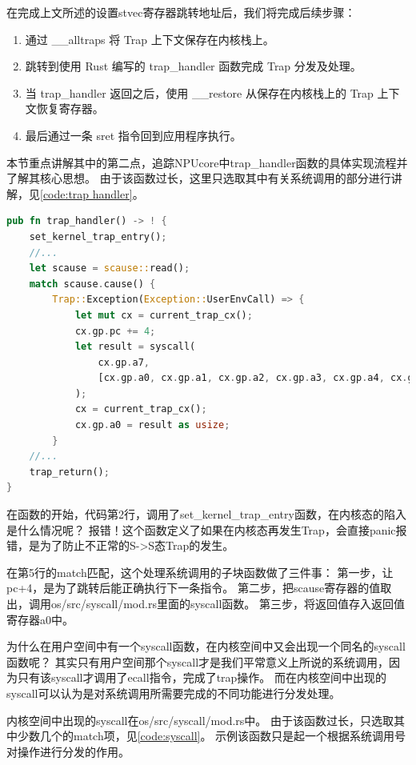 在完成上文所述的设置stvec寄存器跳转地址后，我们将完成后续步骤：

\begin{enumerate}
    \item 通过 __alltraps 将 Trap 上下文保存在内核栈上。
    \item 跳转到使用 Rust 编写的 trap_handler 函数完成 Trap 分发及处理。
    \item 当 trap_handler 返回之后，使用 __restore 从保存在内核栈上的 Trap 上下文恢复寄存器。
    \item 最后通过一条 sret 指令回到应用程序执行。
\end{enumerate}

本节重点讲解其中的第二点，追踪NPUcore中trap_handler函数的具体实现流程并了解其核心思想。
由于该函数过长，这里只选取其中有关系统调用的部分进行讲解，见\autoref{code:trap handler}。

\begin{lstlisting}[language={Rust}, label={code:trap handler},
    caption={trap_handler}]
pub fn trap_handler() -> ! {
    set_kernel_trap_entry();
	//...
    let scause = scause::read();
    match scause.cause() {
        Trap::Exception(Exception::UserEnvCall) => {
            let mut cx = current_trap_cx();
            cx.gp.pc += 4;
            let result = syscall(
                cx.gp.a7,
                [cx.gp.a0, cx.gp.a1, cx.gp.a2, cx.gp.a3, cx.gp.a4, cx.gp.a5],
            );
            cx = current_trap_cx();
            cx.gp.a0 = result as usize;
        }
	//...
    trap_return();
}
\end{lstlisting}

在函数的开始，代码第2行，调用了set_kernel_trap_entry函数，在内核态的陷入是什么情况呢？
报错！这个函数定义了如果在内核态再发生Trap，会直接panic报错，是为了防止不正常的S->S态Trap的发生。

在第5行的match匹配，这个处理系统调用的子块函数做了三件事：
第一步，让pc+4，是为了跳转后能正确执行下一条指令。
第二步，把scause寄存器的值取出，调用os/src/syscall/mod.rs里面的syscall函数。
第三步，将返回值存入返回值寄存器a0中。

为什么在用户空间中有一个syscall函数，在内核空间中又会出现一个同名的syscall函数呢？
其实只有用户空间那个syscall才是我们平常意义上所说的系统调用，因为只有该syscall才调用了ecall指令，完成了trap操作。
而在内核空间中出现的syscall可以认为是对系统调用所需要完成的不同功能进行分发处理。

内核空间中出现的syscall在os/src/syscall/mod.rs中。
由于该函数过长，只选取其中少数几个的match项，见\autoref{code:syscall}。
示例该函数只是起一个根据系统调用号对操作进行分发的作用。

